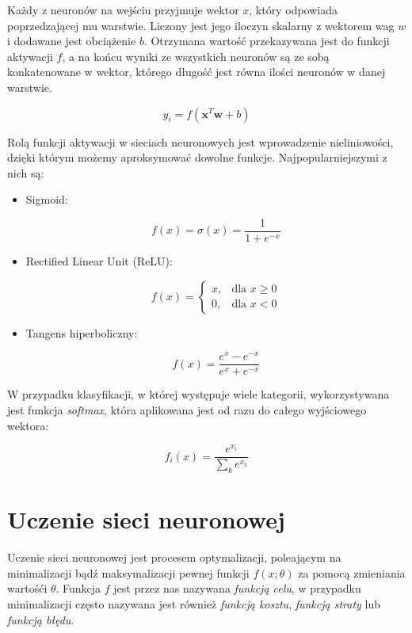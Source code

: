 \documentclass[licencjacka]{pracamgr}
\begin{document}
Każdy z neuronów na wejściu przyjmuje wektor $x$, który odpowiada poprzedzającej mu warstwie. Liczony jest jego iloczyn skalarny z wektorem wag $w$ i dodawane jest obciążenie $b$. Otrzymana wartość przekazywana jest do funkcji aktywacji $f$, a na końcu wyniki ze wszystkich neuronów są ze sobą konkatenowane w wektor, którego długość jest równa ilości neuronów w danej warstwie.

$$ y_i = f(\mathbf{x}^{T}\mathbf{w} + b) $$

Rolą funkcji aktywacji \cite{relu, activation-fn} w sieciach neuronowych jest wprowadzenie nieliniowości, dzięki którym możemy aproksymować dowolne funkcje. Najpopularniejszymi z nich są:

\begin{itemize}
\item Sigmoid:

$$ f(x) = \sigma(x) = \frac{1}{1 + e^{-x}}$$

\item Rectified Linear Unit (ReLU):

$$ f(x) = 
\begin{cases}
    x,              & \text{dla } x \geq 0\\
    0,              & \text{dla } x < 0
\end{cases}
$$

\item Tangens hiperboliczny:

$$ f(x) = \frac{e^x - e^{-x}}{e^x + e^{-x}} $$

\end{itemize}

W przypadku klasyfikacji, w której występuje wiele kategorii, wykorzystywana jest funkcja \emph{softmax}, która aplikowana jest od razu do całego wyjściowego wektora:


$$ f_i(x) = \frac{e^{x_i}}{\sum_k e^{x_k}} $$


\section{Uczenie sieci neuronowej}

Uczenie sieci neuronowej jest procesem optymalizacji, poleającym na minimalizacji bądź maksymalizacji pewnej funkcji $ f(x; \theta) $ za pomocą zmieniania wartośći $ \theta $. Funkcja $ f $ jest przez nas nazywana \emph{funkcją celu}, w przypadku minimalizacji często nazywana jest również \emph{funkcją kosztu}, \emph{funkcją straty} lub \emph{funkcją błędu}. 
\end{document}
